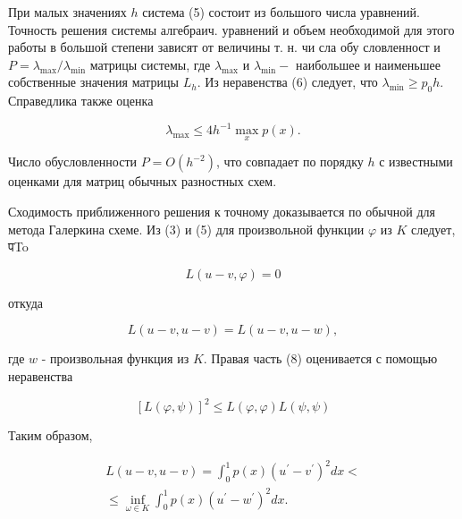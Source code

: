 \documentclass[10pt]{article}
\begin{document}
При малых значениях $h$ система (5) состоит из большого числа уравнений. Точность решения системы алгебраич. уравнений и объем необходимой для этого работы в большой степени зависят от величины т. н. чи сла обу словленност и $P=\lambda_{\max } / \lambda_{\min }$ матрицы системы, где $\lambda_{\max }$ и $\lambda_{\min }-$ наибольшее и наименьшее собственные значения матрицы $L_{h}$. Из неравенства (6) следует, что $\lambda_{\min } \geqslant p_{0} h$. Справедлика также оценка



\[

\lambda_{\max } \leqslant 4 h^{-1} \max _{x} p(x) .

\]



Число обусловленности $P=O\left(h^{-2}\right)$, что совпадает по порядку $h$ с известными оценками для матриц обычных разностных схем.



Сходимость приближенного решения к точному доказывается по обычной для метода Галеркина схеме. Из (3) и (5) для произвольной функции $\varphi$ из $K$ следует, पTo



\[

L(u-v, \varphi)=0

\]



откуда



\[

L(u-v, u-v)=L(u-v, u-w),

\]



где $w$ - произвольная функция из $K$. Правая часть (8) оценивается с помощью неравенства



\[

[L(\varphi, \psi)]^{2} \leqslant L(\varphi, \varphi) L(\psi, \psi)

\]



Таким образом,



\[

\begin{gathered}

L(u-v, u-v)=\int_{0}^{1} p(x)\left(u^{\prime}-v^{\prime}\right)^{2} d x< \\

\leqslant \inf _{\omega \in K} \int_{0}^{1} p(x)\left(u^{\prime}-w^{\prime}\right)^{2} d x .

\end{gathered}

\]
\end{document}
